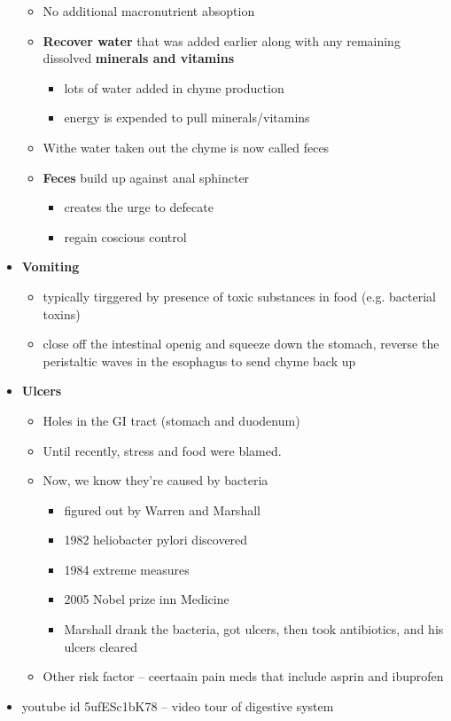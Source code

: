 \documentclass{article}
\theoremstyle{definition}
\begin{document}
\begin{itemize}
		\begin{itemize}
			\item No additional macronutrient absoption
			\item \textbf{Recover water} that was added earlier along with any remaining dissolved \textbf{minerals and vitamins} 
				\begin{itemize}
					\item lots of water added in chyme production
					\item energy is expended to pull minerals/vitamins
				\end{itemize}
			\item Withe water taken out the chyme is now called feces
			\item \textbf{Feces} build up against anal sphincter
				\begin{itemize}
					\item creates the urge to defecate
					\item regain coscious control
				\end{itemize}
		\end{itemize}
	\item \textbf{Vomiting} 
		\begin{itemize}
			\item typically tirggered by presence of toxic substances in food (e.g. bacterial toxins)
			\item close off the intestinal openig and squeeze down the stomach, reverse the peristaltic waves in the esophagus to send chyme back up
		\end{itemize}
	\item \textbf{Ulcers} 
		\begin{itemize}
			\item Holes in the GI tract (stomach and duodenum)
			\item Until recently, stress and food were blamed.
			\item Now, we know they're caused by bacteria
				\begin{itemize}
					\item figured out by Warren and Marshall
					\item 1982 heliobacter pylori discovered
					\item 1984 extreme measures\item 2005 Nobel prize inn Medicine
					\item Marshall drank the bacteria, got ulcers, then took antibiotics, and his ulcers cleared
				\end{itemize}
			\item Other risk factor -- ceertaain pain meds that include asprin and ibuprofen
		\end{itemize}
	\item youtube id 5ufESc1bK78 -- video tour of digestive system
\end{itemize}
\end{document}
